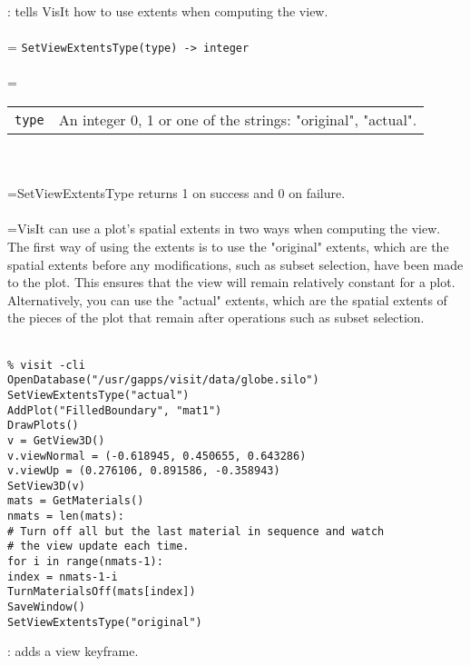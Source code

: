 \documentclass[10pt,a4paper]{report}
\begin{document}
{}
: tells VisIt how to use extents when computing the view.\\[-3mm]

 \\ 
\hangindent=\parindent 
\verb!SetViewExtentsType(type) -> integer!\\ [-3mm]

 \\ 
\hangindent=\parindent 
\begin{tabular}{lp{9cm}}
\verb!type! & An integer 0, 1 or one of the strings: "original", "actual". \\
\end{tabular} \\[-2mm]


 \\ 
\hangindent=\parindent SetViewExtentsType returns 1 on success and 0 on failure. \\[-3mm] 

 \\ 
\hangindent=\parindent VisIt can use a plot's spatial extents in two ways when computing the view. The first way of using the extents is to use the "original" extents, which are the spatial extents before any modifications, such as subset selection, have been made to the plot. This ensures that the view will remain relatively constant for a plot. Alternatively, you can use the "actual" extents, which are the spatial extents of the pieces of the plot that remain after operations such as subset selection. \\[-3mm] 

\\[-6mm]
\begin{verbatim}% visit -cli
OpenDatabase("/usr/gapps/visit/data/globe.silo")
SetViewExtentsType("actual")
AddPlot("FilledBoundary", "mat1")
DrawPlots()
v = GetView3D()
v.viewNormal = (-0.618945, 0.450655, 0.643286)
v.viewUp = (0.276106, 0.891586, -0.358943)
SetView3D(v)
mats = GetMaterials()
nmats = len(mats):
# Turn off all but the last material in sequence and watch
# the view update each time.
for i in range(nmats-1):
index = nmats-1-i
TurnMaterialsOff(mats[index])
SaveWindow()
SetViewExtentsType("original")
\end{verbatim}
\newpage


{}
: adds a view keyframe.\\[-3mm]
\end{document}
